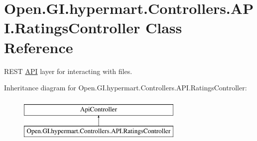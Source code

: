 \hypertarget{class_open_1_1_g_i_1_1hypermart_1_1_controllers_1_1_a_p_i_1_1_ratings_controller}{}\section{Open.\+G\+I.\+hypermart.\+Controllers.\+A\+P\+I.\+Ratings\+Controller Class Reference}
\label{class_open_1_1_g_i_1_1hypermart_1_1_controllers_1_1_a_p_i_1_1_ratings_controller}


R\+E\+ST \hyperlink{namespace_open_1_1_g_i_1_1hypermart_1_1_controllers_1_1_a_p_i}{A\+PI} layer for interacting with files.  


Inheritance diagram for Open.\+G\+I.\+hypermart.\+Controllers.\+A\+P\+I.\+Ratings\+Controller\+:\begin{figure}[H]
\begin{center}
\leavevmode
\includegraphics[height=2.000000cm]{class_open_1_1_g_i_1_1hypermart_1_1_controllers_1_1_a_p_i_1_1_ratings_controller}
\end{center}
\end{figure}

